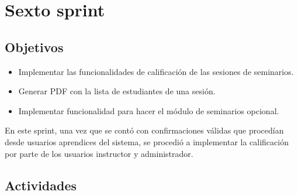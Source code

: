 \section{Sexto sprint} %
\label{sec:sexto_sprint}

\subsection{Objetivos}

\begin{itemize}
	\item Implementar las funcionalidades de calificación de las sesiones de seminarios.
	\item Generar \gls{PDF} con la lista de estudiantes de una sesión.
	\item Implementar funcionalidad para hacer el módulo de seminarios opcional.
\end{itemize}

En este sprint, una vez que se contó con confirmaciones válidas que procedían desde usuarios aprendices del sistema, se procedió a implementar la calificación por parte de los usuarios instructor y administrador. 

\subsection{Actividades} %
\label{sub:actividades6}

